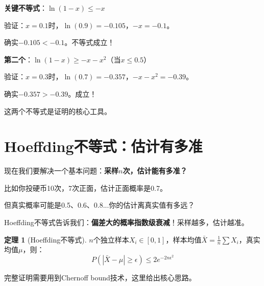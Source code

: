 \documentclass[11pt,a4paper]{article}
\theoremstyle{definition}
\newtheorem{theorem}{定理}[section]
\begin{document}
\begin{calculation}[证明中的关键计算]
\textbf{关键不等式}：$\ln(1-x) \leq -x$

验证：$x = 0.1$时，$\ln(0.9) = -0.105$，$-x = -0.1$。

确实$-0.105 < -0.1$。不等式成立！

\textbf{第二个}：$\ln(1-x) \geq -x - x^2$（当$x \leq 0.5$）

验证：$x = 0.3$时，$\ln(0.7) = -0.357$，$-x - x^2 = -0.39$。

确实$-0.357 > -0.39$。成立！

这两个不等式是证明的核心工具。
\end{calculation}

\section{Hoeffding不等式：估计有多准}

\begin{plainwords}
现在我们要解决一个基本问题：\textbf{采样$n$次，估计能有多准？}

比如你投硬币10次，7次正面，估计正面概率是0.7。

但真实概率可能是0.5、0.6、0.8...你的估计离真实值有多远？

Hoeffding不等式告诉我们：\textbf{偏差大的概率指数级衰减}！采样越多，估计越准。
\end{plainwords}

\begin{theorem}[Hoeffding不等式]
$n$个独立样本$X_i \in [0,1]$，样本均值$\bar{X} = \frac{1}{n}\sum X_i$，真实均值$\mu$，则：
\[
P(|\bar{X} - \mu| \geq \epsilon) \leq 2e^{-2n\epsilon^2}
\]
\end{theorem}

\begin{proofidea}[证明思路]
完整证明需要用到Chernoff bound技术，这里给出核心思路。
\end{proofidea}
\end{document}
